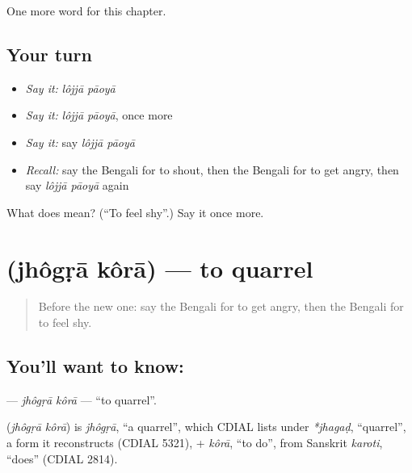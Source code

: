 \begin{grammarlens}[title={What you've built}]
One more word for this chapter.
\end{grammarlens}

\subsection*{Your turn}
\begin{itemize}
\raggedright
  \item \emph{Say it:} \emph{lôjjā pāoyā}
  \item \emph{Say it:} \emph{lôjjā pāoyā}, once more
  \item \emph{Say it:} say \emph{lôjjā pāoyā}
  \item \emph{Recall:} say the Bengali for to shout, then the Bengali for to get angry, then say \emph{lôjjā pāoyā} again
\end{itemize}

\begin{tcolorbox}[breakable,colback=teal!4,colframe=teal!35!black,title={Before you move on}]
What does   mean? (\textquotedblleft{}To feel shy\textquotedblright{}.) Say it once more.
\end{tcolorbox}
\section[\texorpdfstring{\bn{ঝগড়া} \bn{করা} (jhôgṛā kôrā)}{ঝগড়া করা (jhôgṛā kôrā)}]{  (jhôgṛā kôrā) — to quarrel}

\label{lesson:BN-C211-jhogra-kora}



\begin{quote}
Before the new one: say the Bengali for to get angry, then the Bengali for to feel shy.
\end{quote}

\subsection*{You'll want to know:  }
\textbf{ } — \emph{jhôgṛā kôrā} — \textquotedblleft{}to quarrel\textquotedblright{}.

\begin{cousinweb}
\textbf{ } (\emph{jhôgṛā kôrā}) is \emph{jhôgṛā}, \textquotedblleft{}a quarrel\textquotedblright{}, which CDIAL lists under \emph{*jhagaḍ}, \textquotedblleft{}quarrel\textquotedblright{}, a form it reconstructs (CDIAL 5321), + \emph{kôrā}, \textquotedblleft{}to do\textquotedblright{}, from Sanskrit \emph{karoti}, \textquotedblleft{}does\textquotedblright{} (CDIAL 2814).
\end{cousinweb}

